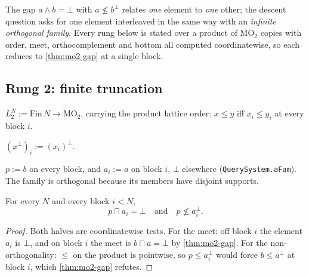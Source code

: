 The gap $a \wedge b = \bot$ with $a \not\le b^{\perp}$ relates \emph{one}
element to \emph{one} other; the descent question asks for one element
interleaved in the same way with an \emph{infinite orthogonal family}. Every
rung below is stated over a product of MO$_2$ copies with order, meet,
orthocomplement and bottom all computed coordinatewise, so each reduces to
\ref{thm:mo2-gap} at a single block.

\subsection{Rung 2: finite truncation}

\begin{definition}
  \label{def:l2n}
  \leanok
  $L_2^N := \mathrm{Fin}\,N \to \mathrm{MO}_2$, carrying the product lattice
  order: $x \le y$ iff $x_i \le y_i$ at every block $i$.
\end{definition}

\begin{definition}
  \label{def:pi-ortho}
  \leanok
  $(x^{\perp})_i := (x_i)^{\perp}$.
\end{definition}

\begin{definition}
  \label{def:descent-witness}
  \leanok
  $p := b$ on every block, and $a_i := a$ on block $i$, $\bot$ elsewhere
  (\texttt{QuerySystem.aFam}). The family is orthogonal because its members have
  disjoint supports.
\end{definition}

\begin{theorem}
  \label{thm:star-finite}
  \leanok
  For every $N$ and every block $i < N$,
  \[ p \sqcap a_i = \bot \quad\text{and}\quad p \not\le a_i^{\perp}. \]
\end{theorem}

\begin{proof}
  \leanok
  Both halves are coordinatewise tests. For the meet: off block $i$ the element
  $a_i$ is $\bot$, and on block $i$ the meet is $b \sqcap a = \bot$ by
  \ref{thm:mo2-gap}. For the non-orthogonality: $\le$ on the product is
  pointwise, so $p \le a_i^{\perp}$ would force $b \le a^{\perp}$ at block $i$,
  which \ref{thm:mo2-gap} refutes.
\end{proof}

